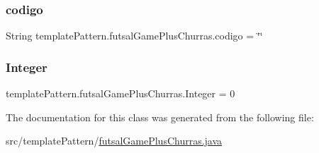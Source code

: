 \subsubsection{\texorpdfstring{codigo}{codigo}}
{\footnotesize\ttfamily String template\+Pattern.\+futsal\+Game\+Plus\+Churras.\+codigo = \char`\"{}\char`\"{}}

\mbox{\label{classtemplate_pattern_1_1futsal_game_plus_churras_a998a7e9071f943246da61e77f87cc427}} 
\subsubsection{\texorpdfstring{Integer}{Integer}}
{\footnotesize\ttfamily template\+Pattern.\+futsal\+Game\+Plus\+Churras.\+Integer = 0}



The documentation for this class was generated from the following file\+:\begin{DoxyCompactItemize}
\item 
src/template\+Pattern/\mbox{\hyperlink{futsal_game_plus_churras_8java}{futsal\+Game\+Plus\+Churras.\+java}}\end{DoxyCompactItemize}
